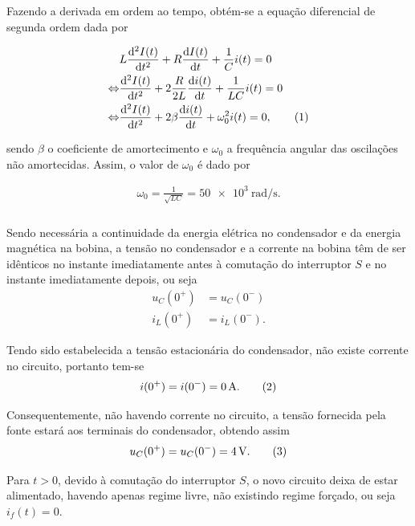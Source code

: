 \documentclass[a4paper, titlepage, portuguese]{article}
\newcommand{\eq}{\Leftrightarrow} %
\newcommand\numberthis{\addtocounter{equation}{1}\tag{\theequation}}
\begin{document}
		Fazendo a derivada em ordem ao tempo, obtém-se a equação diferencial de segunda ordem dada por

		\begin{align*}
			&L \dv[2]{I(t)}{t} + R\dv{I(t)}{t} + \frac{1}{C}i(t) = 0 \\ \eq
			&\dv[2]{I(t)}{t} + 2\frac{R}{2L}\dv{i(t)}{t} + \frac{1}{LC}i(t) = 0 \\ \eq
			&\dv[2]{I(t)}{t} + 2\beta \dv{i(t)}{t} + \omega_{0}^{2} i(t) = 0, \numberthis \label{eq_dif_2ordem}
		\end{align*}

		sendo $\beta$ o coeficiente de amortecimento e $\omega_{0}$ a frequência angular das oscilações não amortecidas. Assim, o valor de $\omega_{0}$ é dado por

		\begin{align*}
			\omega_{0} = \frac{1}{\sqrt{LC}} = \SI{50e3}{\radian\per\second}.
		\end{align*}

	\subsubsection{}

		\par
		Sendo necessária a continuidade da energia elétrica no condensador e da energia magnética na bobina, a tensão no condensador e a corrente na bobina têm de ser idênticos no instante imediatamente antes à comutação do interruptor $S$ e no instante imediatamente depois, ou seja
		\begin{align*}
			u_{C}(0^{+}) &= u_{C}(0^{-})\\
			  i_{L}(0^{+}) &= i_{L}(0^{-}).
		\end{align*}

		Tendo sido estabelecida a tensão estacionária do condensador, não existe corrente no circuito, portanto tem-se
		\begin{align*}
			i(0^{+}) = i(0^{-}) = \SI{0}{\ampere}. \numberthis \label{cond_inicial_corrente}
		\end{align*}

		Consequentemente, não havendo corrente no circuito, a tensão fornecida pela fonte estará aos terminais do condensador, obtendo assim
		\begin{align*}
			u_{C}(0^{+}) = u_{C}(0^{-}) = \SI{4}{\volt}. \numberthis \label{cond_inicial_tensão}
		\end{align*}

		Para $t > 0$, devido à comutação do interruptor $S$, o novo circuito deixa de estar alimentado, havendo apenas regime livre, não existindo regime forçado, ou seja $i_f(t) = 0$.
\end{document}
